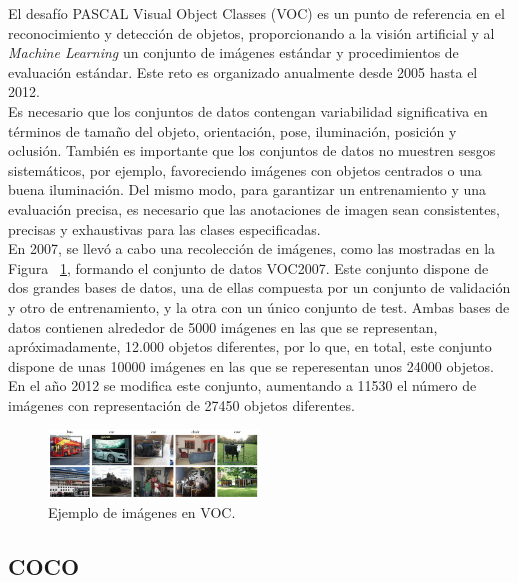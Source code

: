 \documentclass{bmvc2k}
\begin{document}
El desafío PASCAL Visual Object Classes (VOC) es un punto de referencia en el reconocimiento y detección de objetos, proporcionando a la visión artificial y al \textit{Machine Learning} un conjunto de imágenes estándar y procedimientos de evaluación estándar. Este reto es organizado anualmente desde 2005 hasta el 2012.\\

Es necesario que los conjuntos de datos contengan variabilidad significativa en términos de tamaño del objeto, orientación, pose, iluminación, posición y oclusión. También es importante que los conjuntos de datos no muestren sesgos sistemáticos, por ejemplo, favoreciendo imágenes con objetos centrados o una buena iluminación. Del mismo modo, para garantizar un entrenamiento y una evaluación precisa, es necesario que las anotaciones de imagen sean consistentes, precisas y exhaustivas para las clases especificadas.\\

En 2007, se llevó a cabo una recolección de imágenes, como las mostradas en la Figura ~\ref{fig.pascal}, formando el conjunto de datos VOC2007. Este conjunto dispone de dos grandes bases de datos, una de ellas compuesta por un conjunto de validación y otro de entrenamiento, y la otra con un único conjunto de test. Ambas bases de datos contienen alrededor de 5000 imágenes en las que se representan, apróximadamente, 12.000 objetos diferentes, por lo que, en total, este conjunto dispone de unas 10000 imágenes en las que se reperesentan unos 24000 objetos. En el año 2012 se modifica este conjunto, aumentando a 11530 el número de imágenes con representación de 27450 objetos diferentes.\\

\begin{figure}
\begin{center}
	\includegraphics[width=0.5\textwidth]{images/PASCAL.png}
   \caption{Ejemplo de imágenes en VOC.}
	\label{fig.pascal}
\end{center}
\end{figure}

\subsection{COCO}
\end{document}
